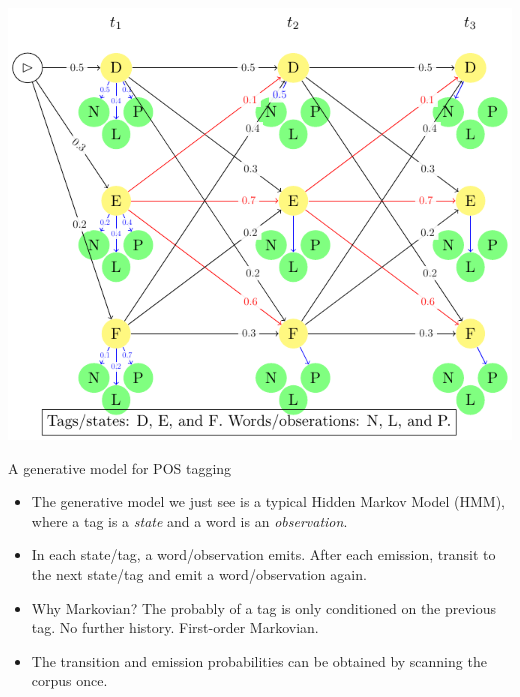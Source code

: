 \documentclass[11pt, handout]{beamer}
\begin{document}
\begin{frame}{}
  \includegraphics[width=\textwidth]{example.pdf}
\end{frame}


 \begin{frame}{A generative model for POS tagging}

\begin{itemize}
 \item The generative model we just see is a typical Hidden Markov Model (HMM), where a tag is a \emph{state} and a word is an \emph{observation}. 
 \item In each state/tag, a word/observation emits. After each emission, transit to the next state/tag and emit a word/observation again. 
 \item Why Markovian?  The probably of a tag is only conditioned on the previous tag. No further history. First-order Markovian. 
 \item The transition and emission probabilities can be obtained by scanning the corpus once. 
\end{itemize}
\end{frame}
\end{document}
